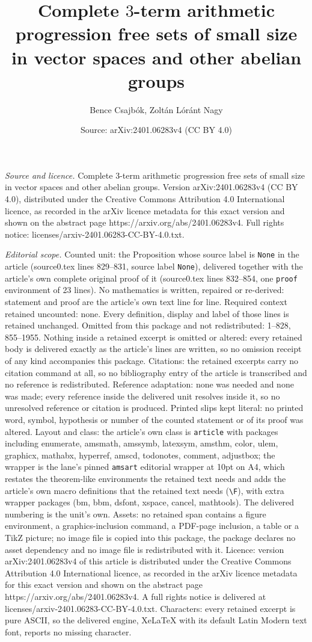\documentclass[10pt,a4paper]{amsart}
\title[Complete $3$-term arithmetic progression free sets of small ]{Complete $3$-term arithmetic progression free sets of small size in vector spaces and other abelian groups}
\author{Bence Csajb\'ok, Zolt\'an L\'or\'ant Nagy}
\date{Source: arXiv:2401.06283v4 (CC BY 4.0)}
\begin{document}
\maketitle

\noindent\emph{Source and licence.} Complete $3$-term arithmetic progression free sets of small size in vector spaces and other abelian groups. Version arXiv:2401.06283v4 (CC BY 4.0), distributed under the Creative Commons Attribution 4.0 International licence, as recorded in the arXiv licence metadata for this exact version and shown on the abstract page https://arxiv.org/abs/2401.06283v4. Full rights notice: licenses/arxiv-2401.06283-CC-BY-4.0.txt.\par\smallskip

\noindent\textit{Editorial scope.} Counted unit: the Proposition whose source label is \texttt{None} in the article (source0.tex lines 829--831, source label \texttt{None}), delivered together with the article's own complete original proof of it (source0.tex lines 832--854, one \texttt{proof} environment of 23 lines). No mathematics is written, repaired or re-derived: statement and proof are the article's own text line for line. Required context retained uncounted: none. Every definition, display and label of those lines is retained unchanged. Omitted from this package and not redistributed: 1--828, 855--1955. Nothing inside a retained excerpt is omitted or altered: every retained body is delivered exactly as the article's lines are written, so no omission receipt of any kind accompanies this package. Citations: the retained excerpts carry no citation command at all, so no bibliography entry of the article is transcribed and no reference is redistributed. Reference adaptation: none was needed and none was made; every reference inside the delivered unit resolves inside it, so no unresolved reference or citation is produced. Printed slips kept literal: no printed word, symbol, hypothesis or number of the counted statement or of its proof was altered. Layout and class: the article's own class is \texttt{article} with packages including enumerate, amsmath, amssymb, latexsym, amsthm, color, ulem, graphicx, mathabx, hyperref, amscd, todonotes, comment, adjustbox; the wrapper is the lane's pinned \texttt{amsart} editorial wrapper at 10pt on A4, which restates the theorem-like environments the retained text needs and adds the article's own macro definitions that the retained text needs (\texttt{\textbackslash F}), with extra wrapper packages (bm, bbm, dsfont, xspace, cancel, mathtools). The delivered numbering is the unit's own. Assets: no retained span contains a figure environment, a graphics-inclusion command, a PDF-page inclusion, a table or a TikZ picture; no image file is copied into this package, the package declares no asset dependency and no image file is redistributed with it. Licence: version arXiv:2401.06283v4 of this article is distributed under the Creative Commons Attribution 4.0 International licence, as recorded in the arXiv licence metadata for this exact version and shown on the abstract page https://arxiv.org/abs/2401.06283v4. A full rights notice is delivered at licenses/arxiv-2401.06283-CC-BY-4.0.txt. Characters: every retained excerpt is pure ASCII, so the delivered engine, XeLaTeX with its default Latin Modern text font, reports no missing character.
\end{document}
